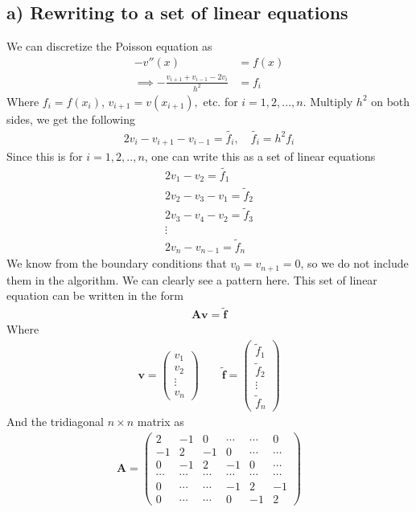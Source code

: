\documentclass[12pt]{article}
\begin{document}
\subsection*{a) Rewriting to a set of linear equations}
We can discretize the Poisson equation as
\begin{align}
-v''(x) &= f(x)\\ \nonumber
\implies -\frac{v_{i+1} + v_{i-1} - 2v_i}{h^2} &= f_i
\end{align}
Where $f_i = f(x_i)$, $v_{i+1}=v(x_{i+1}),$ etc. for $i=1,2,...,n$. Multiply $h^2$ on both sides, we get the following
\begin{align}
2v_i - v_{i+1} - v_{i-1} = \tilde{f_i}, \quad \tilde{f_i} = h^2f_i
\end{align}
Since this is for $i = 1,2,..,n$, one can write this as a set of linear equations
\begin{align}
2v_1 - v_2 = \tilde{f_1} \nonumber \\ 
2v_2 - v_3 - v_1 = \tilde{f}_2 \nonumber \\
2v_3 - v_4 - v_2 = \tilde{f}_3 \nonumber \\
\vdots \nonumber \\
2v_n - v_{n-1} = \tilde{f}_n
\end{align}
We know from the boundary conditions that $v_0 = v_{n+1} = 0$, so we do not include them in the algorithm. We can clearly see a pattern here. This set of linear equation can be written in the form
\begin{align}
\mathbf{A}\mathbf{v} = \mathbf{\tilde{f}}
\end{align}
Where
\begin{align}
\mathbf{v} = 
\begin{pmatrix}
v_1 \\
v_2 \\
\vdots \\
v_n
\end{pmatrix}
\qquad
\mathbf{\tilde{f}} =
\begin{pmatrix}
\tilde{f}_1\\
\tilde{f}_2\\
\vdots \\
\tilde{f}_n
\end{pmatrix}
\end{align}
And the tridiagonal $n \times n$ matrix as
\begin{align}
\mathbf{A} =
\begin{pmatrix}
2 & -1 & 0 & \cdots & \cdots & 0 \\
-1 & 2 & -1 & 0 & \cdots & \cdots \\
0 & -1 & 2 & -1 & 0 & \cdots \\
\cdots & \cdots & \cdots & \cdots & \cdots & \cdots \\
0 & \cdots & \cdots & -1 & 2 & -1 \\
0 & \cdots & \cdots & 0 & -1 & 2
\end{pmatrix}
\end{align}
\end{document}
